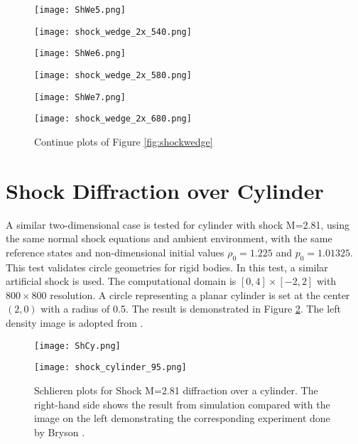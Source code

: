 \begin{figure}

\begin{minipage}{0.49\textwidth}
  \texttt{[image: ShWe5.png]}
\end{minipage}
\begin{minipage}{0.49\textwidth}
  \texttt{[image: shock\_wedge\_2x\_540.png]}
\end{minipage}
\vspace{-10mm}

\begin{minipage}{0.49\textwidth}
  \texttt{[image: ShWe6.png]}
\end{minipage}
\begin{minipage}{0.49\textwidth}
  \texttt{[image: shock\_wedge\_2x\_580.png]}
\end{minipage}
\vspace{-10mm}

\begin{minipage}{0.49\textwidth}
  \texttt{[image: ShWe7.png]}
\end{minipage}
\begin{minipage}{0.49\textwidth}
  \texttt{[image: shock\_wedge\_2x\_680.png]}
\end{minipage}

\caption[Shock diffraction over wedge continuing]{Continue plots of Figure \ref{fig:shockwedge}}
    \label{fig:shockwedge_con}

\end{figure}

\section{Shock Diffraction over Cylinder}
A similar two-dimensional case is tested for cylinder with shock M=2.81, using the same normal shock equations and ambient environment, with the same reference states and non-dimensional initial values $\rho_0=1.225$ and $p_0=1.01325$. This test validates circle geometries for rigid bodies. In this test, a similar artificial shock is used. The computational domain is $[0,4]\times[-2,2]$ with $800\times800$ resolution. A circle representing a planar cylinder is set at the center $(2,0)$ with a radius of 0.5. The result is demonstrated in Figure \ref{fig:ShockCy}. The left density image is adopted from \cite{bryson1961diffraction}.

\begin{figure}[htbp]
\centering
\begin{minipage}{0.25\textwidth}
  \texttt{[image: ShCy.png]}
\end{minipage}
\begin{minipage}{0.45\textwidth}
  \texttt{[image: shock\_cylinder\_95.png]}
\end{minipage}
\caption[Shock diffraction over cylinder]{Schlieren plots for Shock M=2.81 diffraction over a cylinder. The right-hand side shows the result from simulation compared with the image on the left demonstrating the corresponding experiment done by Bryson \cite{bryson1961diffraction}.}
\label{fig:ShockCy}
\end{figure}

